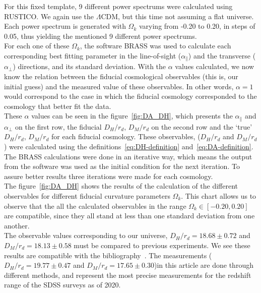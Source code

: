 For this fixed template, 9 different power spectrums were calculated using RUSTICO\@. We again use the $\Lambda$CDM, but this time not assuming a flat universe. Each power spectrum is generated with $\Omega_k$ varying from -0.20 to 0.20, in steps of 0.05, thus yielding the mentioned 9 different power spectrums. \\

For each one of these $\Omega_k$, the software BRASS was used to calculate each corresponding best fitting parameter in the line-of-sight ($\alpha_\parallel$) and the transverse ($\alpha_\perp$) directions, and its standard deviation. With the $\alpha$ values calculated, we now know the relation between the fiducial cosmological observables (this is, our initial guess) and the measured value of these observables. In other words, $\alpha=1$ would correspond to the case in which the fiducial cosmology corresponded to the cosmology that better fit the data.\\

These $\alpha$ values can be seen in the figure~\ref{fig:DA_DH}, which presents the $\alpha_\parallel$ and $\alpha_\perp$ on the first row, the fiducial $D_H / r_d$, $D_M/r_d $ on the second row and the `true' $D_H / r_d$, $D_M /r_d$ for each fiducial cosmology.  
These observables, ($D_H /r_d$ and $D_M /r_d $) were calculated using the definitions~\eqref{eq:DH-definition} and~\eqref{eq:DA-definition}. \\

The BRASS calculations were done in an iterative way, which means the output from the software was used as the initial condition for the next iteration. To assure better results three iterations were made for each cosmology.  \\

The figure~\ref{fig:DA_DH} shows the results of the calculation of the different observables for different fiducial curvature parameters $\Omega_k$. This chart allows us to observe that the all the calculated observables in the range $\Omega_k  \in \left[ -0.20, 0.20   \right] $ are compatible, since they all stand at less than one standard deviation from one another. \\

The observable values corresponding to our universe, $D_H/r_d = 18.68 \pm 0.72$ and $D_M/r_d = 18.13 \pm 0.58$ must be compared to previous experiments. We see these results are compatible with the bibliography~\cite{hector}. The measurements ($D_H/r_d = 19.77\pm0.47$ and $D_M/ r_d=17.65\pm 0.30$)in this article are done through different methods, and represent the most precise measurements for the redshift range of the SDSS surveys as of 2020.

